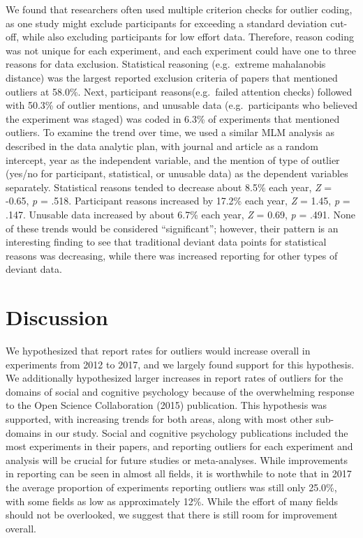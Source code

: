 \documentclass[english,,man,mask]{apa6}
\theoremstyle{definition}
\theoremstyle{definition}
\theoremstyle{definition}
\theoremstyle{remark}
\begin{document}
We found that researchers often used multiple criterion checks for
outlier coding, as one study might exclude participants for exceeding a
standard deviation cut-off, while also excluding participants for low
effort data. Therefore, reason coding was not unique for each
experiment, and each experiment could have one to three reasons for data
exclusion. Statistical reasoning (e.g.~extreme mahalanobis distance) was
the largest reported exclusion criteria of papers that mentioned
outliers at 58.0\%. Next, participant reasons(e.g.~failed attention
checks) followed with 50.3\% of outlier mentions, and unusable data
(e.g.~participants who believed the experiment was staged) was coded in
6.3\% of experiments that mentioned outliers. To examine the trend over
time, we used a similar MLM analysis as described in the data analytic
plan, with journal and article as a random intercept, year as the
independent variable, and the mention of type of outlier (yes/no for
participant, statistical, or unusable data) as the dependent variables
separately. Statistical reasons tended to decrease about 8.5\% each
year, \emph{Z} = -0.65, \emph{p} = .518. Participant reasons increased
by 17.2\% each year, \emph{Z} = 1.45, \emph{p} = .147. Unusable data
increased by about 6.7\% each year, \emph{Z} = 0.69, \emph{p} = .491.
None of these trends would be considered \enquote{significant}; however,
their pattern is an interesting finding to see that traditional deviant
data points for statistical reasons was decreasing, while there was
increased reporting for other types of deviant data.

\section{Discussion}\label{discussion}

We hypothesized that report rates for outliers would increase overall in
experiments from 2012 to 2017, and we largely found support for this
hypothesis. We additionally hypothesized larger increases in report
rates of outliers for the domains of social and cognitive psychology
because of the overwhelming response to the Open Science Collaboration
(2015) publication. This hypothesis was supported, with increasing
trends for both areas, along with most other sub-domains in our study.
Social and cognitive psychology publications included the most
experiments in their papers, and reporting outliers for each experiment
and analysis will be crucial for future studies or meta-analyses. While
improvements in reporting can be seen in almost all fields, it is
worthwhile to note that in 2017 the average proportion of experiments
reporting outliers was still only 25.0\%, with some fields as low as
approximately 12\%. While the effort of many fields should not be
overlooked, we suggest that there is still room for improvement overall.
\end{document}
